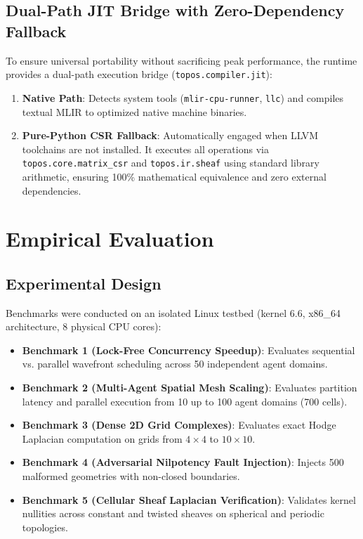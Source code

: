 \documentclass[conference]{IEEEtran}
\begin{document}
\subsection{Dual-Path JIT Bridge with Zero-Dependency Fallback}
To ensure universal portability without sacrificing peak performance, the runtime provides a dual-path execution bridge (\texttt{topos.compiler.jit}):
\begin{enumerate}
    \item \textbf{Native Path}: Detects system tools (\texttt{mlir-cpu-runner}, \texttt{llc}) and compiles textual MLIR to optimized native machine binaries.
    \item \textbf{Pure-Python CSR Fallback}: Automatically engaged when LLVM toolchains are not installed. It executes all operations via \texttt{topos.core.matrix\_csr} and \texttt{topos.ir.sheaf} using standard library arithmetic, ensuring 100\% mathematical equivalence and zero external dependencies.
\end{enumerate}

\section{Empirical Evaluation}

\subsection{Experimental Design}
Benchmarks were conducted on an isolated Linux testbed (kernel 6.6, x86\_64 architecture, 8 physical CPU cores):
\begin{itemize}
    \item \textbf{Benchmark 1 (Lock-Free Concurrency Speedup)}: Evaluates sequential vs. parallel wavefront scheduling across 50 independent agent domains.
    \item \textbf{Benchmark 2 (Multi-Agent Spatial Mesh Scaling)}: Evaluates partition latency and parallel execution from 10 up to 100 agent domains (700 cells).
    \item \textbf{Benchmark 3 (Dense 2D Grid Complexes)}: Evaluates exact Hodge Laplacian computation on grids from $4 \times 4$ to $10 \times 10$.
    \item \textbf{Benchmark 4 (Adversarial Nilpotency Fault Injection)}: Injects 500 malformed geometries with non-closed boundaries.
    \item \textbf{Benchmark 5 (Cellular Sheaf Laplacian Verification)}: Validates kernel nullities across constant and twisted sheaves on spherical and periodic topologies.
\end{itemize}
\end{document}
